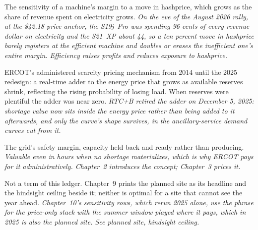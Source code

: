 \begin{description}[leftmargin=0pt,style=unboxed,itemsep=0.35em,parsep=0.15em]
\item[operating leverage] \hypertarget{glossary:operating-leverage}{}The sensitivity of a machine's margin to a move in hashprice, which grows as the share of revenue spent on electricity grows. \emph{On the eve of the August 2026 rally, at the \$42.18 price anchor, the S19j~Pro was spending 96 cents of every revenue dollar on electricity and the S21~XP about 44, so a ten percent move in hashprice barely registers at the efficient machine and doubles or erases the inefficient one's entire margin. Efficiency raises profits and reduces exposure to hashprice.}
\item[Operating Reserve Demand Curve (ORDC)] \hypertarget{glossary:operating-reserve-demand-curve}{}ERCOT's administered scarcity pricing mechanism from 2014 until the 2025 redesign: a real-time adder to the energy price that grows as available reserves shrink, reflecting the rising probability of losing load. When reserves were plentiful the adder was near zero. \emph{RTC+B retired the adder on December 5, 2025: shortage value now sits inside the energy price rather than being added to it afterwards, and only the curve's shape survives, in the ancillary-service demand curves cut from it.}
\item[operating reserves] \hypertarget{glossary:operating-reserves}{}The grid's safety margin, capacity held back and ready rather than producing. \emph{Valuable even in hours when no shortage materializes, which is why ERCOT pays for it administratively. Chapter~2 introduces the concept; Chapter~3 prices it.}
\item[optimal site] \hypertarget{glossary:optimal-site}{}Not a term of this ledger. Chapter~9 prints the planned site as its headline and the hindsight ceiling beside it; neither is optimal for a site that cannot see the year ahead. \emph{Chapter~10's sensitivity rows, which rerun 2025 alone, use the phrase for the price-only stack with the summer window played where it pays, which in 2025 is also the planned site. See planned site, hindsight ceiling.}

\end{description}

